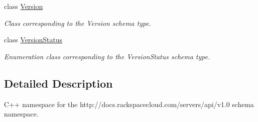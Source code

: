 \begin{DoxyCompactItemize}
class \hyperlink{classopenstack_1_1xml_1_1Version}{Version}
\begin{DoxyCompactList}\small\item\em Class corresponding to the Version schema type. \item\end{DoxyCompactList}\item 
class \hyperlink{classopenstack_1_1xml_1_1VersionStatus}{VersionStatus}
\begin{DoxyCompactList}\small\item\em Enumeration class corresponding to the VersionStatus schema type. \item\end{DoxyCompactList}\end{DoxyCompactItemize}


\subsection{Detailed Description}
C++ namespace for the http://docs.rackspacecloud.com/servers/api/v1.0 schema namespace. 